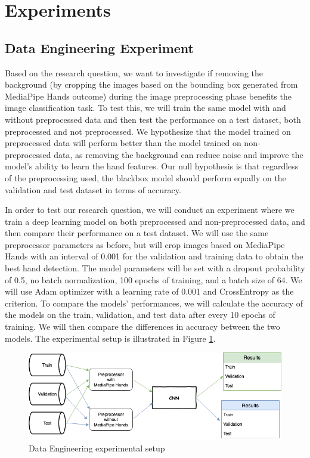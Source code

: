 \documentclass[a4paper]{article}
\begin{document}
\section{Experiments}

\subsection{Data Engineering Experiment}

Based on the research question, we want to investigate if removing the background (by cropping the images based on the bounding box generated from MediaPipe Hands outcome) during the image preprocessing phase benefits the image classification task. To test this, we will train the same model with and without preprocessed data and then test the performance on a test dataset, both preprocessed and not preprocessed. We hypothesize that the model trained on preprocessed data will perform better than the model trained on non-preprocessed data, as removing the background can reduce noise and improve the model's ability to learn the hand features. Our null hypothesis is that regardless of the preprocessing used, the blackbox model should perform equally on the validation and test dataset in terms of accuracy.



In order to test our research question, we will conduct an experiment where we train a deep learning model on both preprocessed and non-preprocessed data, and then compare their performance on a test dataset. We will use the same preprocessor parameters as before, but will crop images based on MediaPipe Hands with an interval of 0.001 for the validation and training data to obtain the best hand detection. The model parameters will be set with a dropout probability of 0.5, no batch normalization, 100 epochs of training, and a batch size of 64. We will use Adam optimizer with a learning rate of 0.001 and CrossEntropy as the criterion. To compare the models' performances, we will calculate the accuracy of the models on the train, validation, and test data after every 10 epochs of training. We will then compare the differences in accuracy between the two models. The experimental setup is illustrated in Figure \ref{fig:exp-de-setup}.


\begin{figure}
    \includegraphics[width=.95\textwidth]{img/experiment/Experiment_Setup.png}
    \caption{Data Engineering experimental setup}
    \label{fig:exp-de-setup}
\end{figure}
\end{document}
